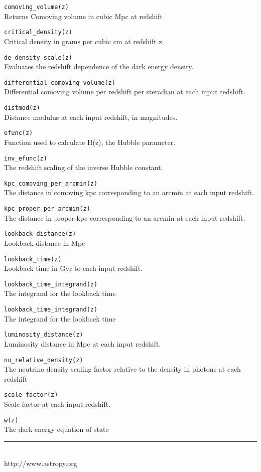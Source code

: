 \begin{multicols}{3}
\verb!comoving_volume(z)!\\
Returns Comoving volume in cubic Mpc at redshift 

\verb!critical_density(z)!\\
Critical density in grams per cubic cm at redshift z.

\verb!de_density_scale(z)!\\
Evaluates the redshift dependence of the dark energy density.

\verb!differential_comoving_volume(z)!\\
Differential comoving volume per redshift per steradian at each input redshift.

\verb!distmod(z)!\\
Distance modulus at each input redshift, in magnitudes.

 \verb!efunc(z)!\\
 Function used to calculate H(z), the Hubble parameter.

\verb!inv_efunc(z)!\\
The redshift scaling of the inverse Hubble constant.

\verb!kpc_comoving_per_arcmin(z)!\\
The distance in comoving kpc corresponding to an arcmin at each input redshift.

\verb!kpc_proper_per_arcmin(z)!\\
The distance in proper kpc corresponding to an arcmin at each input redshift.

\verb!lookback_distance(z)!\\
Lookback distance in Mpc

\verb!lookback_time(z)!\\
Lookback time in Gyr to each input redshift.

\verb!lookback_time_integrand(z)!\\
The integrand for the lookback time

\verb!lookback_time_integrand(z)!\\
The integrand for the lookback time

\verb!luminosity_distance(z)!\\
Luminosity distance in Mpc at each input redshift.

\verb!nu_relative_density(z)!\\
The neutrino density scaling factor relative to the density in photons at each redshift

\verb!scale_factor(z)!\\
Scale factor at each input redshift.

\verb!w(z)!\\
The dark energy equation of state


\rule{0.3\linewidth}{0.25pt}
\scriptsize\\
http://www.astropy.org


\end{multicols}

